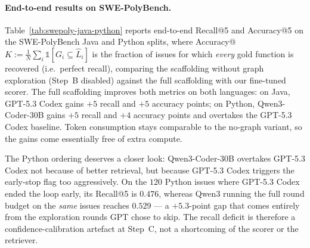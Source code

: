 \paragraph{End-to-end results on SWE-PolyBench.}
Table~\ref{tab:swepoly-java-python} reports end-to-end Recall@5
and Accuracy@5 on the SWE-PolyBench Java and Python splits,
where Accuracy@$K := \frac{1}{N}\sum_i \mathbb{1}[G_i \subseteq
\hat{L}_i]$ is the fraction of issues for which \emph{every}
gold function is recovered (i.e.\ perfect recall), comparing the scaffolding without graph
exploration (Step~B disabled) against the full scaffolding with
our fine-tuned scorer. The full scaffolding improves both
metrics on both languages: on Java, GPT-5.3 Codex gains $+5$
recall and $+5$ accuracy points; on Python, Qwen3-Coder-30B
gains $+5$ recall and $+4$ accuracy points and overtakes the
GPT-5.3 Codex baseline. Token consumption stays comparable to
the no-graph variant, so the gains come essentially free of
extra compute.

The Python ordering deserves a closer look: Qwen3-Coder-30B
overtakes GPT-5.3 Codex not because of better retrieval, but
because GPT-5.3 Codex triggers the early-stop flag too
aggressively. On the $120$ Python issues where GPT-5.3 Codex
ended the loop early, its Recall@5 is $0.476$, whereas Qwen3
running the full round budget on the \emph{same} issues reaches
$0.529$ --- a $+5.3$-point gap that comes entirely from the
exploration rounds GPT chose to skip. The recall deficit is
therefore a confidence-calibration artefact at Step~C, not a
shortcoming of the scorer or the retriever.

